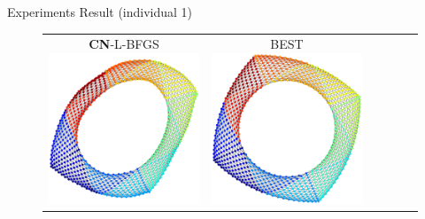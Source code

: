 \documentclass[dvipdfmx,13pt,aspectratio=169]{beamer}
\begin{document}
\begin{frame}{Experiments Result (individual 1)}
\begin{figure}[h]
\begin{tabular}{cccccc}
        \makecell{\small{\textsf{\textbf{CN}-L-BFGS}}                                                                                                       \\[-0.2em]\includegraphics[width=0.135\columnwidth]{../main/individual/vis/jagmesh1_CN-L-BFGS.png}} &
        \makecell{\small{\textsf{BEST}}                                                                                                                     \\[-0.2em]\includegraphics[width=0.135\columnwidth]{../main/individual/vis/opt_jagmesh1.png}} \\


\end{tabular}
\end{figure}
\end{frame}
\end{document}
